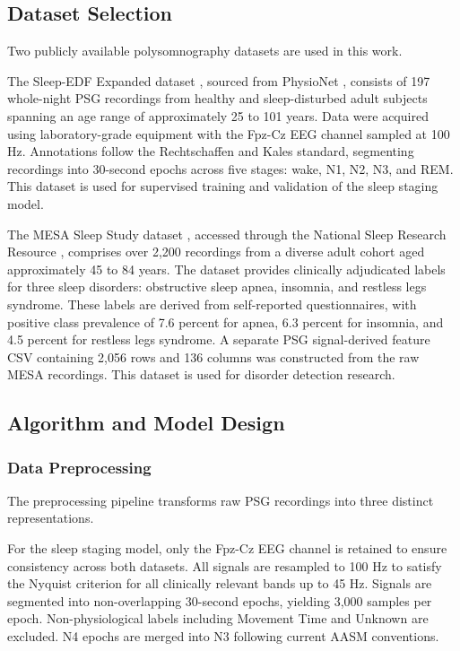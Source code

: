 \subsection{Dataset Selection}

Two publicly available polysomnography datasets are used in this work.

The Sleep-EDF Expanded dataset \cite{sleepedfx}, sourced from PhysioNet \cite{physiobank}, consists of 197 whole-night PSG recordings from healthy and sleep-disturbed adult subjects spanning an age range of approximately 25 to 101 years. Data were acquired using laboratory-grade equipment with the Fpz-Cz EEG channel sampled at 100 Hz. Annotations follow the Rechtschaffen and Kales standard, segmenting recordings into 30-second epochs across five stages: wake, N1, N2, N3, and REM. This dataset is used for supervised training and validation of the sleep staging model.

The MESA Sleep Study dataset \cite{mesa2020}, accessed through the National Sleep Research Resource \cite{nsrr}, comprises over 2,200 recordings from a diverse adult cohort aged approximately 45 to 84 years. The dataset provides clinically adjudicated labels for three sleep disorders: obstructive sleep apnea, insomnia, and restless legs syndrome. These labels are derived from self-reported questionnaires, with positive class prevalence of 7.6 percent for apnea, 6.3 percent for insomnia, and 4.5 percent for restless legs syndrome. A separate PSG signal-derived feature CSV containing 2,056 rows and 136 columns was constructed from the raw MESA recordings. This dataset is used for disorder detection research.

\subsection{Algorithm and Model Design}

\subsubsection{Data Preprocessing}

The preprocessing pipeline transforms raw PSG recordings into three distinct representations.

For the sleep staging model, only the Fpz-Cz EEG channel is retained to ensure consistency across both datasets. All signals are resampled to 100 Hz to satisfy the Nyquist criterion for all clinically relevant bands up to 45 Hz. Signals are segmented into non-overlapping 30-second epochs, yielding 3,000 samples per epoch. Non-physiological labels including Movement Time and Unknown are excluded. N4 epochs are merged into N3 following current AASM conventions.

